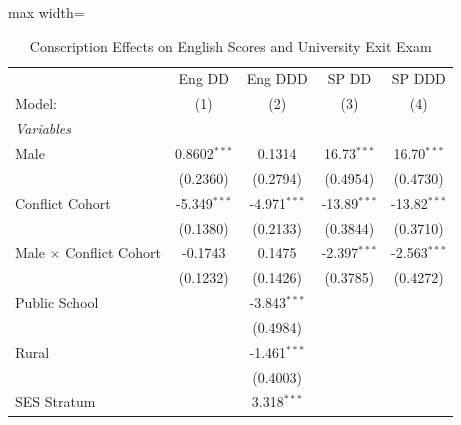 
\begin{table}[htbp]
   \caption{\label{tab:outcomes} Conscription Effects on English Scores and University Exit Exam}
   \centering
   \begin{adjustbox}{max width=\textwidth}
   \begin{tabular}{lcccc}
      \tabularnewline \midrule \midrule
                                                             & Eng DD         & Eng DDD        & SP DD          & SP DDD \\   
      Model:                                                 & (1)            & (2)            & (3)            & (4)\\  
      \midrule
      \emph{Variables}\\
      Male                                                   & 0.8602$^{***}$ & 0.1314         & 16.73$^{***}$  & 16.70$^{***}$\\   
                                                             & (0.2360)       & (0.2794)       & (0.4954)       & (0.4730)\\   
      Conflict Cohort                                        & -5.349$^{***}$ & -4.971$^{***}$ & -13.89$^{***}$ & -13.82$^{***}$\\   
                                                             & (0.1380)       & (0.2133)       & (0.3844)       & (0.3710)\\   
      Male $\times$ Conflict Cohort                          & -0.1743        & 0.1475         & -2.397$^{***}$ & -2.563$^{***}$\\   
                                                             & (0.1232)       & (0.1426)       & (0.3785)       & (0.4272)\\   
      Public School                                          &                & -3.843$^{***}$ &                &   \\   
                                                             &                & (0.4984)       &                &   \\   
      Rural                                                  &                & -1.461$^{***}$ &                &   \\   
                                                             &                & (0.4003)       &                &   \\   
      SES Stratum                                            &                & 3.318$^{***}$  &                &   \\   

\end{tabular}
\end{adjustbox}
\end{table}
